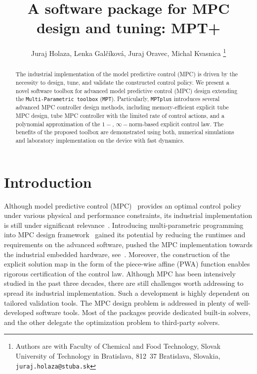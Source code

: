 \documentclass[letterpaper, 10 pt, conference]{ieeeconf}
\title{\LARGE \bf
	A software package for MPC design and tuning: MPT+
}
\author{Juraj Holaza, Lenka Gal\v{c}\'{i}kov\'{a}, Juraj Oravec, Michal Kvasnica
	\thanks{Authors are with Faculty of Chemical and Food Technology,
		Slovak University of Technology in Bratislava, 812~37 Bratislava, Slovakia,
		\texttt{juraj.holaza@stuba.sk}}
}
\begin{document}
	
	
	
	\maketitle
	\thispagestyle{empty}
	\pagestyle{empty}
	
	\begin{abstract}
		
		The industrial implementation of the model predictive control (MPC) is driven by the necessity to design, tune, and validate the constructed control policy. 
		We present a novel software toolbox for advanced model predictive control (MPC) design extending the \texttt{Multi-Parametric toolbox} (\texttt{MPT}).  Particularly, \texttt{MPTplus} introduces several advanced MPC controller design methods, including memory-efficient explicit tube MPC design, tube MPC controller with the limited rate of control actions, and a polynomial approximation of the $1-$, $\infty-$norm-based explicit control law. The benefits of the proposed toolbox are demonstrated using both, numerical simulations and laboratory implementation on the device with fast dynamics.  
		
	\end{abstract}
	
	\section{Introduction}
	\label{sec:introduction}
	
	Although model predictive control (MPC)~\cite{M00, B17} provides an optimal control policy under various physical and performance constraints, its industrial implementation is still under significant relevance~\cite{QB03}. 
	Introducing multi-parametric programming into MPC design framework~\cite{BM02} gained its potential by reducing the runtimes and requirements on the advanced software, pushed the MPC implementation towards the industrial embedded hardware, see~\cite{PK21}. Moreover, the construction of the explicit solution map in the form of the piece-wise affine (PWA) function enables rigorous certification of the control law. 
	Although MPC has been intensively studied in the past three decades, there are still challenges worth addressing to spread its industrial implementation. Such a development is highly dependent on tailored validation tools. 
	The MPC design problem is addressed in plenty of well-developed software tools. Most of the packages provide dedicated built-in solvers, and the other delegate the optimization problem to third-party solvers. 
	
\end{document}
